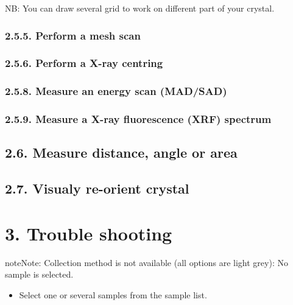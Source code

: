 \documentclass[a4paper,10pt,english]{sphinxmanual}
\begin{document}
NB: You can draw several grid to work on different part of your crystal.


\subsection{2.5.5. Perform a mesh scan}
\label{user_manual:perform-a-mesh-scan}

\subsection{2.5.6. Perform a X-ray centring}
\label{user_manual:perform-a-x-ray-centring}

\subsection{2.5.8. Measure an energy scan (MAD/SAD)}
\label{user_manual:measure-an-energy-scan-mad-sad}

\subsection{2.5.9. Measure a X-ray fluorescence (XRF) spectrum}
\label{user_manual:measure-a-x-ray-fluorescence-xrf-spectrum}

\section{2.6. Measure distance, angle or area}
\label{user_manual:measure-distance-angle-or-area}

\section{2.7. Visualy re-orient crystal}
\label{user_manual:visualy-re-orient-crystal}

\chapter{3. Trouble shooting}
\label{user_manual:trouble-shooting}
\begin{notice}{note}{Note:}
Collection method is not available (all options are light grey): No sample is selected.
\end{notice}
\begin{itemize}
\item {} 
Select one or several samples from the sample list.

\end{itemize}
\end{document}
